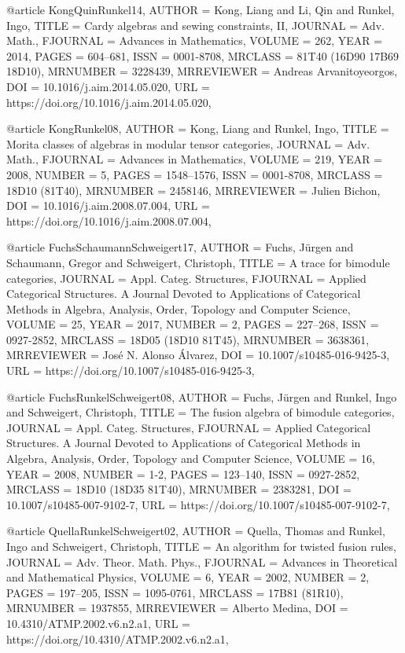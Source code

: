@article {KongQuinRunkel14,
    AUTHOR = {Kong, Liang and Li, Qin and Runkel, Ingo},
     TITLE = {Cardy algebras and sewing constraints, {II}},
   JOURNAL = {Adv. Math.},
  FJOURNAL = {Advances in Mathematics},
    VOLUME = {262},
      YEAR = {2014},
     PAGES = {604--681},
      ISSN = {0001-8708},
   MRCLASS = {81T40 (16D90 17B69 18D10)},
  MRNUMBER = {3228439},
MRREVIEWER = {Andreas Arvanitoyeorgos},
       DOI = {10.1016/j.aim.2014.05.020},
       URL = {https://doi.org/10.1016/j.aim.2014.05.020},
}

@article {KongRunkel08,
    AUTHOR = {Kong, Liang and Runkel, Ingo},
     TITLE = {Morita classes of algebras in modular tensor categories},
   JOURNAL = {Adv. Math.},
  FJOURNAL = {Advances in Mathematics},
    VOLUME = {219},
      YEAR = {2008},
    NUMBER = {5},
     PAGES = {1548--1576},
      ISSN = {0001-8708},
   MRCLASS = {18D10 (81T40)},
  MRNUMBER = {2458146},
MRREVIEWER = {Julien Bichon},
       DOI = {10.1016/j.aim.2008.07.004},
       URL = {https://doi.org/10.1016/j.aim.2008.07.004},
}

@article {FuchsSchaumannSchweigert17,
    AUTHOR = {Fuchs, J\"{u}rgen and Schaumann, Gregor and Schweigert, Christoph},
     TITLE = {A trace for bimodule categories},
   JOURNAL = {Appl. Categ. Structures},
  FJOURNAL = {Applied Categorical Structures. A Journal Devoted to
              Applications of Categorical Methods in Algebra, Analysis,
              Order, Topology and Computer Science},
    VOLUME = {25},
      YEAR = {2017},
    NUMBER = {2},
     PAGES = {227--268},
      ISSN = {0927-2852},
   MRCLASS = {18D05 (18D10 81T45)},
  MRNUMBER = {3638361},
MRREVIEWER = {Jos\'{e} N. Alonso \'{A}lvarez},
       DOI = {10.1007/s10485-016-9425-3},
       URL = {https://doi.org/10.1007/s10485-016-9425-3},
}

@article {FuchsRunkelSchweigert08,
    AUTHOR = {Fuchs, J\"{u}rgen and Runkel, Ingo and Schweigert, Christoph},
     TITLE = {The fusion algebra of bimodule categories},
   JOURNAL = {Appl. Categ. Structures},
  FJOURNAL = {Applied Categorical Structures. A Journal Devoted to
              Applications of Categorical Methods in Algebra, Analysis,
              Order, Topology and Computer Science},
    VOLUME = {16},
      YEAR = {2008},
    NUMBER = {1-2},
     PAGES = {123--140},
      ISSN = {0927-2852},
   MRCLASS = {18D10 (18D35 81T40)},
  MRNUMBER = {2383281},
       DOI = {10.1007/s10485-007-9102-7},
       URL = {https://doi.org/10.1007/s10485-007-9102-7},
}

@article {QuellaRunkelSchweigert02,
    AUTHOR = {Quella, Thomas and Runkel, Ingo and Schweigert, Christoph},
     TITLE = {An algorithm for twisted fusion rules},
   JOURNAL = {Adv. Theor. Math. Phys.},
  FJOURNAL = {Advances in Theoretical and Mathematical Physics},
    VOLUME = {6},
      YEAR = {2002},
    NUMBER = {2},
     PAGES = {197--205},
      ISSN = {1095-0761},
   MRCLASS = {17B81 (81R10)},
  MRNUMBER = {1937855},
MRREVIEWER = {Alberto Medina},
       DOI = {10.4310/ATMP.2002.v6.n2.a1},
       URL = {https://doi.org/10.4310/ATMP.2002.v6.n2.a1},
}

